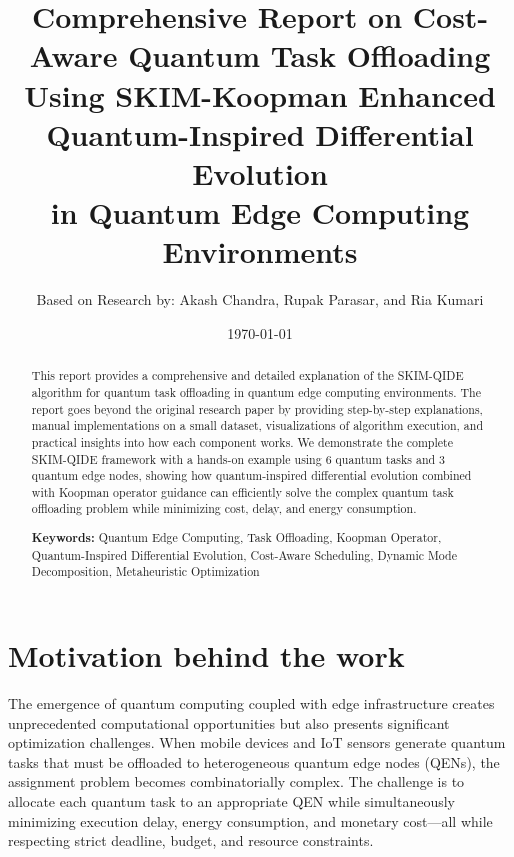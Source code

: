 \documentclass[12pt,a4paper]{article}
\begin{document}
\title{\Large\textbf{Comprehensive Report on Cost-Aware Quantum Task Offloading\\
Using SKIM-Koopman Enhanced Quantum-Inspired Differential Evolution\\
in Quantum Edge Computing Environments}}
\author{Based on Research by: Akash Chandra, Rupak Parasar, and Ria Kumari}
\date{\today}
\maketitle

\begin{abstract}
This report provides a comprehensive and detailed explanation of the SKIM-QIDE algorithm for quantum task offloading in quantum edge computing environments. The report goes beyond the original research paper by providing step-by-step explanations, manual implementations on a small dataset, visualizations of algorithm execution, and practical insights into how each component works. We demonstrate the complete SKIM-QIDE framework with a hands-on example using 6 quantum tasks and 3 quantum edge nodes, showing how quantum-inspired differential evolution combined with Koopman operator guidance can efficiently solve the complex quantum task offloading problem while minimizing cost, delay, and energy consumption.

\textbf{Keywords:} Quantum Edge Computing, Task Offloading, Koopman Operator, Quantum-Inspired Differential Evolution, Cost-Aware Scheduling, Dynamic Mode Decomposition, Metaheuristic Optimization
\end{abstract}

\newpage
\tableofcontents
\newpage

\section{Motivation behind the work}

The emergence of quantum computing coupled with edge infrastructure creates unprecedented computational opportunities but also presents significant optimization challenges. When mobile devices and IoT sensors generate quantum tasks that must be offloaded to heterogeneous quantum edge nodes (QENs), the assignment problem becomes combinatorially complex. The challenge is to allocate each quantum task to an appropriate QEN while simultaneously minimizing execution delay, energy consumption, and monetary cost---all while respecting strict deadline, budget, and resource constraints.
\end{document}
